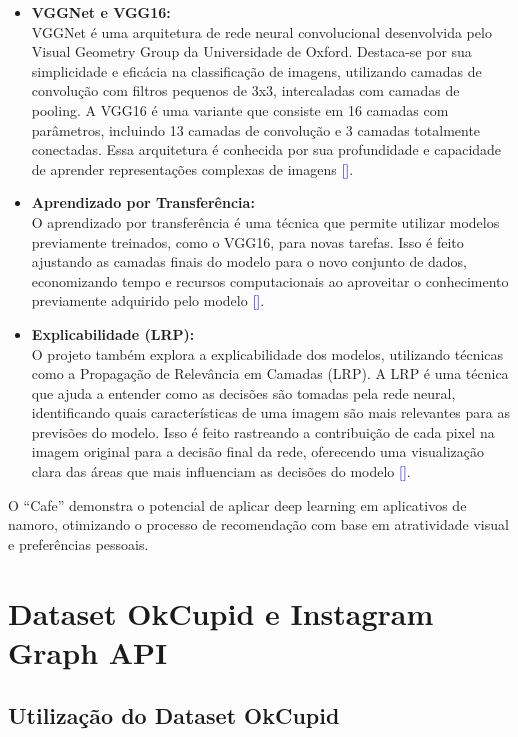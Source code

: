 \begin{itemize}
    \item \textbf{VGGNet e VGG16:} \\
    VGGNet é uma arquitetura de rede neural convolucional desenvolvida pelo Visual Geometry Group da Universidade de Oxford. Destaca-se por sua simplicidade e eficácia na classificação de imagens, utilizando camadas de convolução com filtros pequenos de 3x3, intercaladas com camadas de pooling. A VGG16 é uma variante que consiste em 16 camadas com parâmetros, incluindo 13 camadas de convolução e 3 camadas totalmente conectadas. Essa arquitetura é conhecida por sua profundidade e capacidade de aprender representações complexas de imagens \textcolor{blue}{[\cite{Simonyan2014}]}.

    \item \textbf{Aprendizado por Transferência:} \\
    O aprendizado por transferência é uma técnica que permite utilizar modelos previamente treinados, como o VGG16, para novas tarefas. Isso é feito ajustando as camadas finais do modelo para o novo conjunto de dados, economizando tempo e recursos computacionais ao aproveitar o conhecimento previamente adquirido pelo modelo \textcolor{blue}{[\cite{Krizhevsky2012}]}.

    \item \textbf{Explicabilidade (LRP):} \\
    O projeto também explora a explicabilidade dos modelos, utilizando técnicas como a Propagação de Relevância em Camadas (LRP). A LRP é uma técnica que ajuda a entender como as decisões são tomadas pela rede neural, identificando quais características de uma imagem são mais relevantes para as previsões do modelo. Isso é feito rastreando a contribuição de cada pixel na imagem original para a decisão final da rede, oferecendo uma visualização clara das áreas que mais influenciam as decisões do modelo \textcolor{blue}{[\cite{Bach2015}]}.
\end{itemize}

O ``Cafe'' demonstra o potencial de aplicar deep learning em aplicativos de namoro, otimizando o processo de recomendação com base em atratividade visual e preferências pessoais.

\section{Dataset OkCupid e Instagram Graph API}

\subsection{Utilização do Dataset OkCupid}

